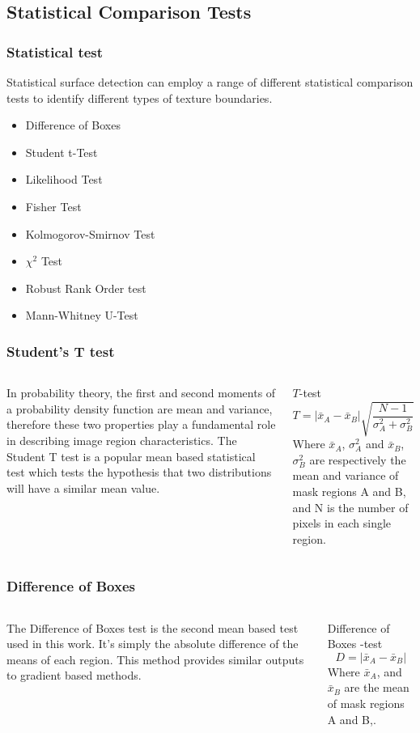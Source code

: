 \documentclass[9pt]{beamer}
\begin{document}
\subsection{Statistical Comparison Tests}
\begin{frame}
	\frametitle{ Statistical test }
Statistical surface detection can employ a range of different statistical comparison tests to identify different types of texture boundaries.
\begin{itemize}
\item Difference of Boxes
\item Student t-Test
\item Likelihood Test
\item Fisher Test
\item Kolmogorov-Smirnov Test
\item $\chi^{2}$ Test
\item Robust Rank Order test
\item Mann-Whitney U-Test 
\end{itemize}
\end{frame}
\begin{frame}
	\frametitle{ Student's T test }
	\begin{columns}
	In probability theory, the first and second moments of a probability density function are mean and variance, therefore these two properties play a fundamental role in describing image region characteristics. The Student T test is a popular mean based statistical test which tests the hypothesis that two distributions will have a similar mean value.
	\begin{block}{ $T$-test}
				\begin{equation}
					T = |\bar{x}_{A} - \bar{x}_{B}|\sqrt{\frac{N-1}{\sigma_{A}^{2} + \sigma_{B}^{2}}}
				\end{equation}
			Where $\bar{x}_{A}$, $\sigma_{A}^{2}$ and $\bar{x}_{B}$, $\sigma_{B}^{2}$ are respectively the mean and variance of mask regions A and B, and N is the number of pixels in each single region. 
			\end{block}
			\end{columns}
\end{frame}
\begin{frame}
\frametitle{ Difference of Boxes }
\begin{columns}
The Difference of Boxes test is the second mean based test used in this work. It's simply the absolute difference of the means of each region. This method provides similar outputs to gradient based methods.
\begin{block}{ Difference of Boxes -test}
			\begin{equation}
				D= |\bar{x}_{A} - \bar{x}_{B}|
			\end{equation}
		Where $\bar{x}_{A}$, and $\bar{x}_{B}$ are the mean  of mask regions A and B,. 
		\end{block}
		\end{columns}
\end{frame}
\end{document}
